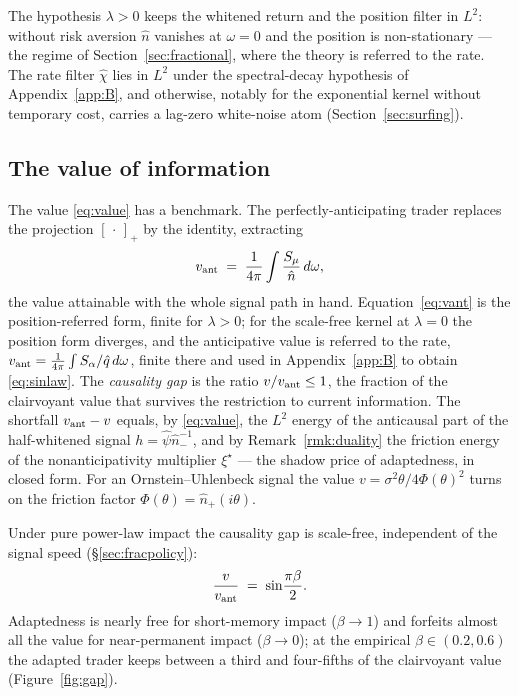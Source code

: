 \documentclass[11pt]{article}
\newcommand{\pluspart}[1]{\left[#1\right]_+}
\theoremstyle{plain}
\theoremstyle{definition}
\theoremstyle{remark}
\begin{document}
The hypothesis $\lambda>0$ keeps the whitened return and the position filter in $L^2$: without risk aversion $\hat n$ vanishes at $\omega=0$ and the position is non-stationary --- the regime of Section~\ref{sec:fractional}, where the theory is referred to the rate. The rate filter $\hat\chi$ lies in $L^2$ under the spectral-decay hypothesis of Appendix~\ref{app:B}, and otherwise, notably for the exponential kernel without temporary cost, carries a lag-zero white-noise atom (Section~\ref{sec:surfing}).

\subsection{The value of information}\label{sec:value}

The value \eqref{eq:value} has a benchmark. The perfectly-anticipating trader replaces the projection $\pluspart{\,\cdot\,}$ by the identity, extracting
\begin{equation}\label{eq:vant}
v_{\rm ant} \;=\; \frac{1}{4\pi}\int \frac{S_\mu}{\hat n}\,d\omega,
\end{equation}
the value attainable with the whole signal path in hand. Equation~\eqref{eq:vant} is the position-referred form, finite for $\lambda>0$; for the scale-free kernel at $\lambda=0$ the position form diverges, and the anticipative value is referred to the rate, $v_{\rm ant}=\frac{1}{4\pi}\int S_\alpha/\hat q\,d\omega$, finite there and used in Appendix~\ref{app:B} to obtain \eqref{eq:sinlaw}. The \emph{causality gap} is the ratio $v/v_{\rm ant}\le1$, the fraction of the clairvoyant value that survives the restriction to current information. The shortfall $v_{\rm ant}-v$ equals, by \eqref{eq:value}, the $L^2$ energy of the anticausal part of the half-whitened signal $h=\hat\psi\hat n_-^{-1}$, and by Remark~\ref{rmk:duality} the friction energy of the nonanticipativity multiplier $\xi^\star$ --- the shadow price of adaptedness, in closed form. For an Ornstein--Uhlenbeck signal the value $v=\sigma^2\theta/4\Phi(\theta)^2$ turns on the friction factor $\Phi(\theta)=\hat n_+(i\theta)$. 

Under pure power-law impact the causality gap is scale-free, independent of the signal speed (\S\ref{sec:fracpolicy}):
\begin{equation}\label{eq:sinlaw}
\frac{v}{v_{\rm ant}} \;=\; \sin\!\frac{\pi\beta}{2}.
\end{equation}
Adaptedness is nearly free for short-memory impact ($\beta\to1$) and forfeits almost all the value for near-permanent impact ($\beta\to0$); at the empirical $\beta\in(0.2,0.6)$ the adapted trader keeps between a third and four-fifths of the clairvoyant value (Figure~\ref{fig:gap}).
\end{document}
